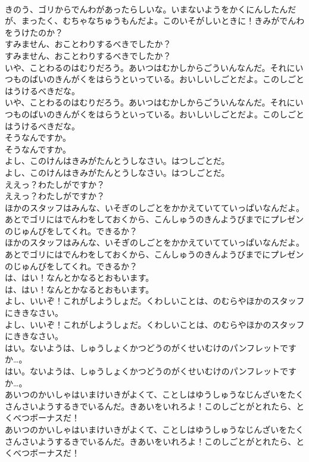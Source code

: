 \documentclass[8pt]{extreport}
\begin{document}
\begin{CJK}{UTF8}{min}
\\	きのう、ゴリからでんわがあったらしいな。いまないようをかくにんしたんだが、まったく、むちゃなちゅうもんだよ。このいそがしいときに！きみがでんわをうけたのか？ 
\\	すみません、おことわりするべきでしたか？	
\\	すみません、おことわりするべきでしたか？ 
\\	いや、ことわるのはむりだろう。あいつはむかしからごういんなんだ。それにいつものばいのきんがくをはらうといっている。おいしいしごとだよ。このしごとはうけるべきだな。	
\\	いや、ことわるのはむりだろう。あいつはむかしからごういんなんだ。それにいつものばいのきんがくをはらうといっている。おいしいしごとだよ。このしごとはうけるべきだな。 
\\	そうなんですか。	
\\	そうなんですか。 
\\	よし、このけんはきみがたんとうしなさい。はつしごとだ。	
\\	よし、このけんはきみがたんとうしなさい。はつしごとだ。 
\\	ええっ？わたしがですか？	
\\	ええっ？わたしがですか？ 
\\	ほかのスタッフはみんな、いそぎのしごとをかかえていてていっぱいなんだよ。あとでゴリにはでんわをしておくから、こんしゅうのきんようびまでにプレゼンのじゅんびをしてくれ。できるか？	
\\	ほかのスタッフはみんな、いそぎのしごとをかかえていてていっぱいなんだよ。あとでゴリにはでんわをしておくから、こんしゅうのきんようびまでにプレゼンのじゅんびをしてくれ。できるか？ 
\\	は、はい！なんとかなるとおもいます。	
\\	は、はい！なんとかなるとおもいます。 
\\	よし、いいぞ！これがしようしょだ。くわしいことは、のむらやほかのスタッフにききなさい。	
\\	よし、いいぞ！これがしようしょだ。くわしいことは、のむらやほかのスタッフにききなさい。 
\\	はい。ないようは、しゅうしょくかつどうのがくせいむけのパンフレットですか…。	
\\	はい。ないようは、しゅうしょくかつどうのがくせいむけのパンフレットですか…。 
\\	あいつのかいしゃはいまけいきがよくて、ことしはゆうしゅうなじんざいをたくさんさいようするきでいるんだ。きあいをいれろよ！このしごとがとれたら、とくべつボーナスだ！	
\\	あいつのかいしゃはいまけいきがよくて、ことしはゆうしゅうなじんざいをたくさんさいようするきでいるんだ。きあいをいれろよ！このしごとがとれたら、とくべつボーナスだ！ 

\end{CJK}
\end{document}

